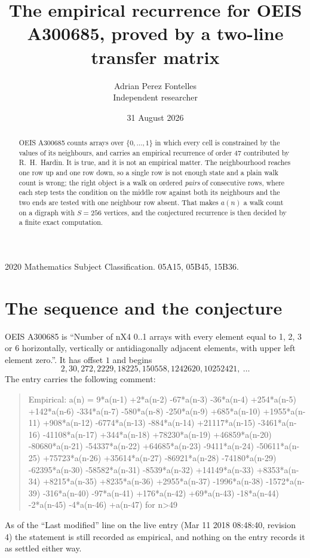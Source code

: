 \documentclass[11pt,a4paper]{article}
\title{The empirical recurrence for OEIS A300685, proved by a two-line transfer matrix}
\author{Adrian Perez Fontelles\\ \small Independent researcher}
\date{31 August 2026}
\theoremstyle{plain}
\theoremstyle{definition}
\begin{document}
\maketitle

\begin{abstract}
OEIS A300685 counts arrays over $\{0,\dots,1\}$ in which every cell is constrained by the
values of its neighbours, and carries an empirical recurrence of order $47$ contributed
by R.~H.~Hardin. It is true, and it is not an empirical matter. The neighbourhood reaches one
row up and one row down, so a single row is not enough state and a plain walk count
is wrong; the right object is a walk on ordered \emph{pairs} of consecutive rows, where
each step tests the condition on the middle row against both its neighbours and the two
ends are tested with one neighbour row absent. That makes $a(n)$ a walk count on a digraph
with $S=256$ vertices, and the conjectured recurrence is then decided by a finite exact
computation.
\end{abstract}

\noindent\small 2020 Mathematics Subject Classification. 05A15, 05B45, 15B36.\normalsize

\section{The sequence and the conjecture}

OEIS A300685 is ``Number of nX4 0..1 arrays with every element equal to 1, 2, 3 or 6 horizontally, vertically or antidiagonally adjacent elements, with upper left element zero.''. It has offset $1$ and begins
\[
2, 30, 272, 2229, 18225, 150558, 1242620, 10252421,\ \dots
\]
The entry carries the following comment:
\begin{quote}\small
Empirical: a(n) = 9*a(n-1) +2*a(n-2) -67*a(n-3) -36*a(n-4) +254*a(n-5) +142*a(n-6) -334*a(n-7) -580*a(n-8) -250*a(n-9) +685*a(n-10) +1955*a(n-11) +908*a(n-12) -6774*a(n-13) -884*a(n-14) +21117*a(n-15) -3461*a(n-16) -41108*a(n-17) +344*a(n-18) +78230*a(n-19) +46859*a(n-20) -80680*a(n-21) -54337*a(n-22) +64685*a(n-23) -9411*a(n-24) -50611*a(n-25) +75723*a(n-26) +35614*a(n-27) -86921*a(n-28) -74180*a(n-29) -62395*a(n-30) -58582*a(n-31) -8539*a(n-32) +14149*a(n-33) +8353*a(n-34) +8215*a(n-35) +8235*a(n-36) +2955*a(n-37) -1996*a(n-38) -1572*a(n-39) -316*a(n-40) -97*a(n-41) +176*a(n-42) +69*a(n-43) -18*a(n-44) -2*a(n-45) -4*a(n-46) +a(n-47) for n>49
\end{quote}
As of the ``Last modified'' line on the live entry (Mar 11 2018 08:48:40, revision 4) the statement is
still recorded as empirical, and nothing on the entry records it as settled either way.
\end{document}
